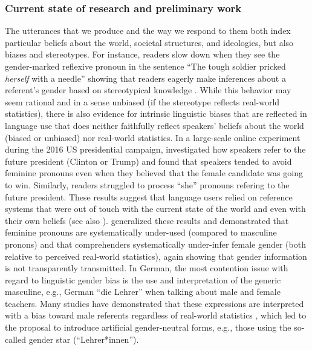 \documentclass[11pt]{article}
\begin{document}
\subsubsection{Current state of research and preliminary work}



The utterances that we produce and the way we respond to them both index particular beliefs about the world, societal structures, and ideologies, but also biases and stereotypes.  For instance, readers slow down when they see the gender-marked reflexive pronoun in the sentence “The tough soldier pricked \textit{herself} with a needle” showing that readers eagerly make inferences about a referent’s gender based on stereotypical knowledge \parencite{Sturt2003, KennisonTrofe2003}.  While this behavior may seem rational and in a sense unbiased (if the stereotype reflects real-world statistics), there is also evidence for intrinsic linguistic biases that are reflected in language use that does neither faithfully reflect speakers’ beliefs about the world (biased or unbiased) nor real-world statistics.  In a large-scale online experiment during the 2016 US presidential campaign, \textcite{MalsburgEtAl2020} investigated how speakers refer to the future president (Clinton or Trump) and found that speakers tended to avoid feminine pronouns even when they believed that the female candidate was going to win.  Similarly, readers struggled to process “she” pronouns refering to the future president.  These results suggest that language users relied on reference systems that were out of touch with the current state of the world and even with their own beliefs (see also \cite{PozniakBurnett2021, PoppelsEtAl2021CUNY}).  \textcite{BoyceEtAl2019LSA} generalized these results and demonstrated that feminine pronouns are systematically under-used (compared to masculine pronons) and that comprehenders systematically under-infer female gender (both relative to perceived real-world statistics), again showing that gender information is not transparently transmitted.  In German, the most contention issue with regard to linguistic gender bias is the use and interpretation of the generic masculine, e.g., German “die Lehrer” when talking about male and female teachers.  Many studies have demonstrated that these expressions are interpreted with a bias toward male referents regardless of real-world statistics \parencite[e.g.,][]{GygaxEtAl2008}, which led to the proposal to introduce artificial gender-neutral forms, e.g., those using the so-called gender star (“Lehrer*innen”).
\end{document}
